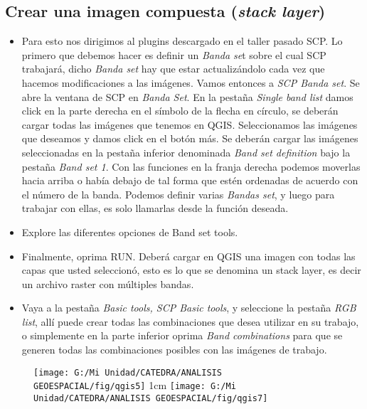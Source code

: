 \documentclass[a4paper,oneside,11pt,]{article}
\begin{document}
\subsection{Crear una imagen compuesta (\emph{stack layer})}
\begin{itemize}
\item Para esto nos dirigimos al plugins descargado en el taller pasado SCP. Lo primero que debemos hacer es definir un \emph{Banda se}t sobre el cual SCP trabajará, dicho \emph{Banda set} hay que estar actualizándolo cada vez que hacemos modificaciones a las imágenes. Vamos entonces a  \emph{SCP Banda set}.  Se abre la ventana de SCP en \emph{Banda Set}. En la pestaña \emph{Single band list} damos click en la parte derecha en el símbolo de la flecha en círculo, se deberán cargar todas las imágenes que tenemos en QGIS. Seleccionamos las imágenes que deseamos y damos click en el botón más. Se deberán cargar las imágenes seleccionadas en la pestaña inferior denominada \emph{Band set definition} bajo la pestaña \emph{Band set 1}. Con las funciones en la franja derecha podemos moverlas hacia arriba o había debajo de tal forma que estén ordenadas de acuerdo con el número de la banda. Podemos definir varias \emph{Bandas set}, y luego para trabajar con ellas, es solo llamarlas desde la función deseada. 
\item Explore las diferentes opciones de Band set tools.
\item Finalmente, oprima RUN. Deberá cargar en QGIS una imagen con todas las capas que usted seleccionó, esto es lo que se denomina un stack layer, es decir un archivo raster con múltiples bandas.  
\item Vaya a la pestaña \emph{Basic tools, SCP Basic tools}, y seleccione la pestaña \emph{RGB list}, allí puede crear todas las combinaciones que desea utilizar en su trabajo, o simplemente en la parte inferior oprima \emph{Band combinations} para que se generen todas las combinaciones posibles con las imágenes de trabajo.
\end{itemize}

\begin{figure}
\centering
\texttt{[image: G:/Mi Unidad/CATEDRA/ANALISIS GEOESPACIAL/fig/qgis5]}
\vfill{1cm}
\texttt{[image: G:/Mi Unidad/CATEDRA/ANALISIS GEOESPACIAL/fig/qgis7]}
\end{figure}
\end{document}
